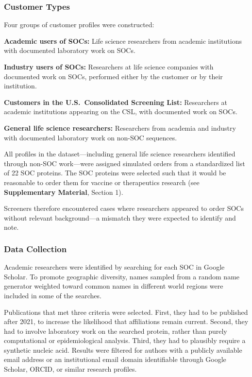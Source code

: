 \documentclass[utf8]{FrontiersinHarvard}
\begin{document}
\subsubsection{Customer Types}

Four groups of customer profiles were constructed:

\textbf{Academic users of SOCs:} Life science researchers from academic institutions with documented laboratory work on SOCs.

\textbf{Industry users of SOCs:} Researchers at life science companies with documented work on SOCs, performed either by the customer or by their institution.

\textbf{Customers in the U.S.\ Consolidated Screening List:} Researchers at academic institutions appearing on the CSL, with documented work on SOCs.

\textbf{General life science researchers:} Researchers from academia and industry with documented laboratory work on non-SOC sequences.

All profiles in the dataset—including general life science researchers identified through non-SOC work—were assigned simulated orders from a standardized list of 22 SOC proteins. The SOC proteins were selected such that it would be reasonable to order them for vaccine or therapeutics research (see \textbf{Supplementary Material}, Section 1).

Screeners therefore encountered cases where researchers appeared to order SOCs without relevant background—a mismatch they were expected to identify and note.

\subsubsection{Data Collection}

Academic researchers were identified by searching for each SOC in Google Scholar. To promote geographic diversity, names sampled from a random name generator weighted toward common names in different world regions were included in some of the searches.

Publications that met three criteria were selected. First, they had to be published after 2021, to increase the likelihood that affiliations remain current. Second, they had to involve laboratory work on the searched protein, rather than purely computational or epidemiological analysis. Third, they had to plausibly require a synthetic nucleic acid. Results were filtered for authors with a publicly available email address or an institutional email domain identifiable through Google Scholar, ORCID, or similar research profiles.
\end{document}
